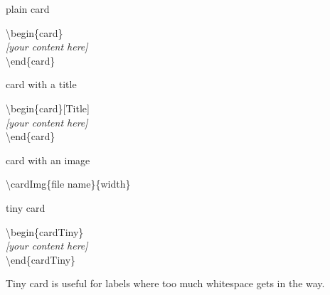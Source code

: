 \documentclass[aspectratio=1610,dvipsnames, noamsthm]{beamer}
\begin{document}
\usePrimaryRed
\useAccentLightGreen



\begin{frame}{plain card}
  \begin{card}
  \end{card}

  \begin{card}
    {\color{accent} \textbackslash begin\{card\}\\[2mm]}
    \null\qquad \textit{[your content here]}\\[2mm]
    {\color{accent} \textbackslash end\{card\}}
  \end{card}
\end{frame}





\usePrimaryPurple
\useAccentRed



\begin{frame}{card with a title}
  \begin{card}[Title]
  \end{card}

  \begin{card}
    {\color{accent} \textbackslash begin\{card\}[Title]\\[2mm]}
    \null\qquad \textit{[your content here]}\\[2mm]
    {\color{accent} \textbackslash end\{card\}}
  \end{card}
\end{frame}



\usePrimaryOrange
\useAccentPurple




\begin{frame}{card with an image}
  \centering

  \begin{card}
    {\color{accent} \textbackslash cardImg\{file name\}\{width\}}
  \end{card}
\end{frame}







\usePrimaryLightBlue
\useAccentOrange


\begin{frame}{tiny card}
  \begin{cardTiny}
  \end{cardTiny}

  \begin{card}
    {\color{accent} \textbackslash begin\{cardTiny\}\\[2mm]}
    \null\qquad \textit{[your content here]}\\[2mm]
    {\color{accent} \textbackslash end\{cardTiny\}}
  \end{card}
  \begin{card}
    Tiny card is useful for labels where too much whitespace gets in the way.
  \end{card}
\end{frame}
\end{document}
